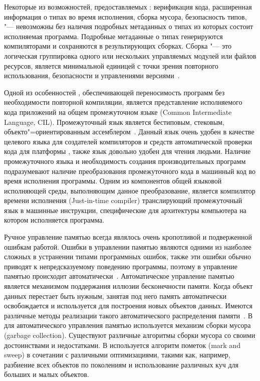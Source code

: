Некоторые из возможностей, предоставляемых \dotnet{}: верификация кода, расширенная информация о типах во время исполнения, сборка мусора, безопасность типов, "--- невозможны без наличия подробных метаданных о типах из которых состоит исполняемая программа.
Подробные метаданные о типах генерируются компиляторами и сохраняются в результирующих сборках.
Сборка "--- это логическая группировка одного или нескольких управляемых модулей или файлов ресурсов, является минимальной единицей с точки зрения повторного использования, безопасности и управлениями версиями~\cite[с.~6]{richter_2012_en}.

Одной из особенностей \dotnet{}, обеспечивающей переносимость программ без необходимости повторной компиляции, является представление исполняемого кода приложений на общем промежуточном языке (Common Intermediate Language, CIL).
Промежуточный язык является бестиповым, стековым, объекто"=ориентированным ассемблером~\cite[с.~16\,--\,17]{richter_2012_en}.
Данный язык очень удобен в качестве целевого языка для создателей компиляторов и средств автоматической проверки кода для платформы \dotnet{}, также язык довольно удобен для чтения людьми.
Наличие промежуточного языка и необходимость создания производительных программ подразумевают наличие преобразования промежуточного кода в машинный код во время исполнения программы.
Одним из компонентов общей языковой исполняющей среды, выполняющим данное преобразование, является компилятор времени исполнения (Just-in-time compiler) транслирующий промежуточный язык в машинные инструкции, специфические для архитектуры компьютера на котором исполняется программа.

Ручное управление памятью всегда являлось очень кропотливой и подверженной ошибкам работой.
Ошибки в управлении памятью являются одними из наиболее сложных в устранении типами программных ошибок, также эти ошибки обычно приводят к непредсказуемому поведению программы, поэтому в \dotnet{} управление памятью происходит автоматически~\cite[с.~505\,--\,506]{richter_2012_en}.
Автоматическое управление памятью является механизмом поддержания иллюзии бесконечности памяти.
Когда объект данных перестает быть нужным, занятая под него память автоматически освобождается и используется для построения новых объектов данных.
Имеются различные методы реализации такого автоматического распределения памяти~\cite[с.~489]{sicp_2006_ru}.
В~\dotnet{} для автоматического управления памятью используется механизм сборки мусора (garbage collection).
Существуют различные алгоритмы сборки мусора со своими достоинствами и недостатками.
В \dotnet{} используется алгоритм пометок (mark and sweep) в сочетании с различными оптимизациями, такими как, например, разбиение всех объектов по поколениям и использование различных куч для больших и малых объектов.

